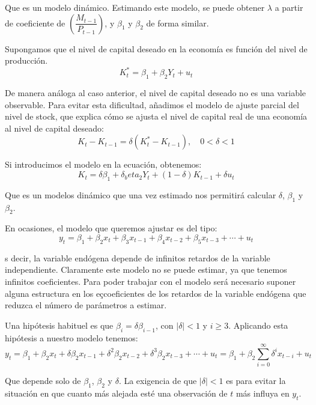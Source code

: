 Que es un modelo din\'amico. Estimando este modelo, se puede obtener $\lambda$ a partir de coeficiente de $\left(\dfrac{M_{t-1}}{P_{t-1}}\right)$, y $\beta_1$ y $\beta_2$ de forma similar.


Supongamos que el nivel de capital deseado en la econom\'ia es funci\'on del nivel de producci\'on.
\[K_t^{*}=\beta_1+\beta_2Y_t+u_t\]

De manera an\'aloga al caso anterior, el nivel de capital deseado no es una variable observable. Para evitar esta dificultad, a\~nadimos el modelo de ajuste parcial del nivel de stock, que explica c\'omo se ajusta el nivel de capital real de una econom\'ia al nivel de capital deseado:
\[K_t-K_{t-1}=\delta(K_t^{*}-K_{t-1}),\quad0<\delta<1\]

Si introducimos el modelo en la ecuaci\'on, obtenemos:
\[K_t=\delta\beta_1+\delta_beta_2 Y_t+(1-\delta)K_{t-1}+\delta u_t\]

Que es un modelos din\'amico que una vez estimado nos permitir\'a calcular $\delta$, $\beta_1$ y $\beta_2$.





En ocasiones, el modelo que queremos ajustar es del tipo:
\[y_t=\beta_1+\beta_2x_t+\beta_3x_{t-1}+\beta_4x_{t-2}+\beta_5x_{t-3}+\cdots+u_t\]

s decir, la variable end\'ogena depende de infinitos retardos de la variable independiente. Claramente este modelo no se puede estimar, ya que tenemos infinitos coeficientes. Para poder trabajar con el modelo ser\'a necesario suponer alguna estructura en los eçcoeficientes de los retardos de la variable end\'ogena que reduzca el n\'umero de par\'ametros a estimar.


Una hip\'otesis habituel es que $\beta_i=\delta\beta_{i-1}$, con $|\delta|<1$ y $i\geq3$. Aplicando esta hip\'otesis a nuestro modelo tenemos:
\[y_t=\beta_1+\beta_2x_t+\delta\beta_2x_{t-1}+\delta^2\beta_2x_{t-2}+\delta^3\beta_2x_{t-3}+\cdots+u_t=\beta_1+\beta_2\sum_{i=0}^{\infty}\delta^ix_{t-i}+u_t\]

Que depende solo de $\beta_1$, $\beta_2$ y $\delta$. La exigencia de que $|\delta|<1$ es para evitar la situaci\'on en que cuanto m\'as alejada est\'e una observaci\'on de $t$ m\'as influya en $y_t$. 

